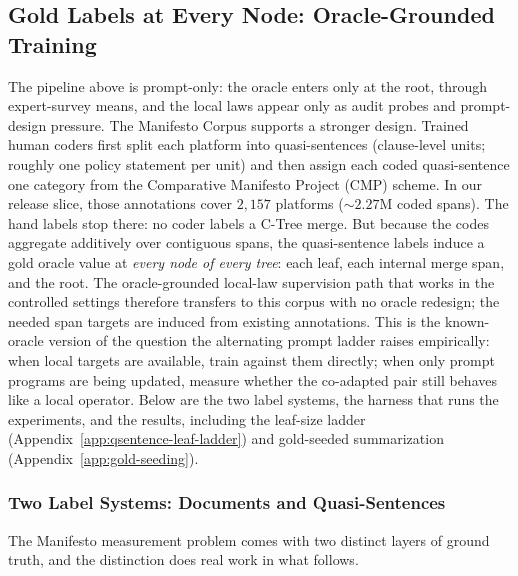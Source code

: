 \subsection{Gold Labels at Every Node: Oracle-Grounded Training}\label{sec:manifesto-qsentence}\label{sec:rile-oracle}

The pipeline above is prompt-only: the oracle enters only at the root,
through expert-survey means, and the local laws appear only as audit
probes and prompt-design pressure. The Manifesto Corpus supports a
stronger design. Trained human coders first split each platform into
quasi-sentences (clause-level units; roughly one policy statement per
unit) and then assign each coded quasi-sentence one category from the
Comparative Manifesto Project (CMP) scheme. In our release slice, those
annotations cover $2{,}157$ platforms ($\sim\!2.27$M coded spans). The
hand labels stop there: no coder labels a C-Tree merge. But because the
codes aggregate additively over contiguous spans, the quasi-sentence
labels induce a gold oracle value at \emph{every node of every tree}:
each leaf, each internal merge span, and the root. The oracle-grounded
local-law supervision path that works in the controlled settings
therefore transfers to this corpus with no oracle redesign; the needed
span targets are induced from existing annotations. This is the
known-oracle version of the question the alternating prompt ladder
raises empirically: when local targets are available, train against
them directly; when only prompt programs are being updated, measure
whether the co-adapted pair still behaves like a local operator. Below
are the two label systems, the harness that runs the experiments, and
the results, including the leaf-size ladder
(Appendix~\ref{app:qsentence-leaf-ladder}) and gold-seeded
summarization (Appendix~\ref{app:gold-seeding}).

\subsubsection{Two Label Systems: Documents and Quasi-Sentences}\label{sec:qsentence-labels}

The Manifesto measurement problem comes with two distinct layers of
ground truth, and the distinction does real work in what follows.

